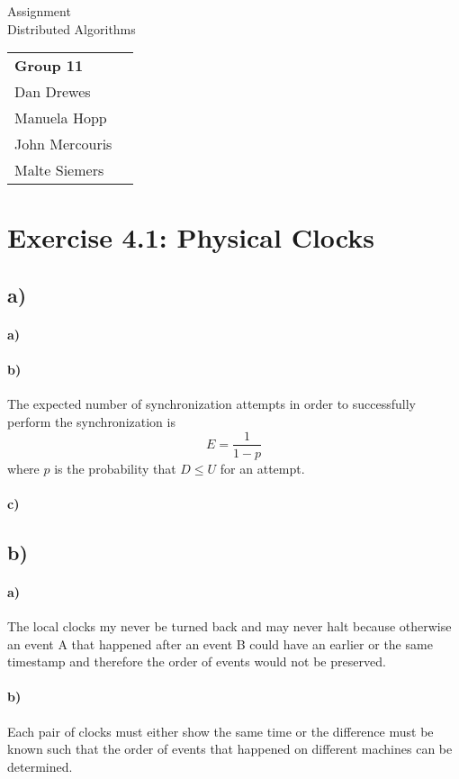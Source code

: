 \documentclass[12pt,a4paper]{article}
\begin{document}
\begin{center}
  \Large Assignment  \\
  \large Distributed Algorithms
\end{center}
\begin{flushright}
  \begin{tabular}{ll}
    \textbf{Group 11} \\
    Dan Drewes        \\ 
    Manuela Hopp      \\ 
    John Mercouris    \\
    Malte Siemers     \\
  \end{tabular} 
\end{flushright}


\section*{Exercise 4.1: Physical Clocks}
  \subsection*{a)} %
  	\paragraph{a)}
  	\paragraph{b)} The expected number of synchronization attempts in order to successfully perform the synchronization is 
  	\[ E = \frac{1}{1-p} \]
  	where $p$ is the probability that $D \leq U$ for an attempt.
  	\paragraph{c)}
  \subsection*{b)} %
    \paragraph{a)} The local clocks my never be turned back and may never halt because otherwise an event A that happened after an event B could have an earlier or the same timestamp and therefore the order of events would not be preserved.
  	\paragraph{b)} Each pair of clocks must either show the same time or the difference must be known such that the order of events that happened on different machines can be determined.
\end{document}
